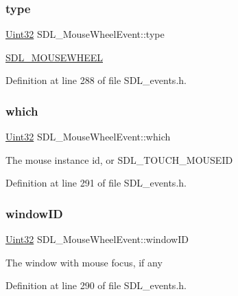 \subsubsection{\texorpdfstring{type}{type}}
{\footnotesize\ttfamily \mbox{\hyperlink{_s_d_l__stdinc_8h_add440eff171ea5f55cb00c4a9ab8672d}{Uint32}} S\+D\+L\+\_\+\+Mouse\+Wheel\+Event\+::type}

\mbox{\hyperlink{_s_d_l__events_8h_a3b589e89be6b35c02e0dd34a55f3fccaa63135c2e0aea2286f05066f3c0bc5c4e}{S\+D\+L\+\_\+\+M\+O\+U\+S\+E\+W\+H\+E\+EL}} 

Definition at line 288 of file S\+D\+L\+\_\+events.\+h.

\mbox{\label{struct_s_d_l___mouse_wheel_event_a014dc767d52e8b75ba26a5f12e1704e8}} 
\subsubsection{\texorpdfstring{which}{which}}
{\footnotesize\ttfamily \mbox{\hyperlink{_s_d_l__stdinc_8h_add440eff171ea5f55cb00c4a9ab8672d}{Uint32}} S\+D\+L\+\_\+\+Mouse\+Wheel\+Event\+::which}

The mouse instance id, or S\+D\+L\+\_\+\+T\+O\+U\+C\+H\+\_\+\+M\+O\+U\+S\+E\+ID 

Definition at line 291 of file S\+D\+L\+\_\+events.\+h.

\mbox{\label{struct_s_d_l___mouse_wheel_event_ab45eb1895217214ecb773fc555e08f6c}} 
\subsubsection{\texorpdfstring{windowID}{windowID}}
{\footnotesize\ttfamily \mbox{\hyperlink{_s_d_l__stdinc_8h_add440eff171ea5f55cb00c4a9ab8672d}{Uint32}} S\+D\+L\+\_\+\+Mouse\+Wheel\+Event\+::window\+ID}

The window with mouse focus, if any 

Definition at line 290 of file S\+D\+L\+\_\+events.\+h.

\mbox{\label{struct_s_d_l___mouse_wheel_event_a6d904eef474ea45a5b1828fcb5b0f859}} 
